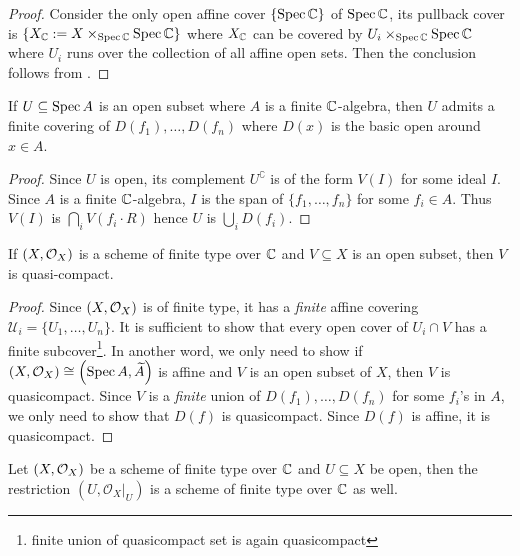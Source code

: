 \begin{proof}
  Consider the only open affine cover $\{\operatorname{Spec} \mathbb{C}\}$ of $\operatorname{Spec} \mathbb{C}$, its pullback cover is $\{X_{\mathbb{C}} := X \times_{\operatorname{Spec}\mathbb{C}} \operatorname{Spec}\mathbb{C}\}$ where $X_{\mathbb{C}}$ can be covered by $U_{i}\times_{\operatorname{Spec} \mathbb{C}}\operatorname{Spec} \mathbb{C}$ where $U_{i}$ runs over the collection of all affine open sets.
  Then the conclusion follows from .

\end{proof}

\begin{lemma} If $U \subseteq \operatorname{Spec} A$ is an open subset where $A$ is a finite $\mathbb{C}$-algebra, then $U$ admits a finite covering of $D(f_{1}),\dots, D(f_{n})$ where $D(x)$ is the basic open around $x \in A$.
\end{lemma}
\begin{proof}
  Since $U$ is open, its complement $U^{\complement}$ is of the form $V(I)$ for some ideal $I$. Since $A$ is a finite $\mathbb{C}$-algebra, $I$ is the span of $\{f_{1},\dots, f_{n}\}$ for some $f_{i} \in A$. Thus $V(I)$ is $\bigcap_{i}V(f_{i}\cdot R)$ hence $U$ is $\bigcup_{i}D(f_{i})$.
\end{proof}

\begin{lemma}
   If $\left(X, \mathcal{O}_{X}\right)$ is a scheme of finite type over $\mathbb{C}$ and $V \subseteq X$ is an open subset, then $V$ is quasi-compact.
\end{lemma}
\begin{proof}
  Since $\left(X, \mathcal{O}_{X}\right)$ is of finite type, it has a {\em\/ finite} affine covering $\mathscr{U}_{i} = \{U_{1},\dots, U_{n}\}$.
  It is sufficient to show that every open cover of $U_{i} \cap V$ has a finite subcover\footnote{finite union of quasicompact set is again quasicompact}. In another word, we only need to show if $\left(X, \mathcal{O}_{X}\right) \cong \left(\operatorname*{Spec}{A}, \widetilde{A}\right)$ is affine and $V$ is an open subset of $X$, then $V$ is quasicompact. Since $V$ is a {\em finite\/} union of $D(f_{1}),\dots, D(f_{n})$ for some $f_{i}$'s in $A$, we only need to show that $D(f)$ is quasicompact. Since $D(f)$ is affine, it is quasicompact.
\end{proof}

\begin{corollary}
  Let $\left(X, \mathcal{O}_{X}\right)$ be a scheme of finite type over $\mathbb{C}$ and $U \subseteq X$ be open, then the restriction $(U, \mathscr{O}_{X}|_{U})$ is a scheme of finite type over $\mathbb{C}$ as well.
\end{corollary}

